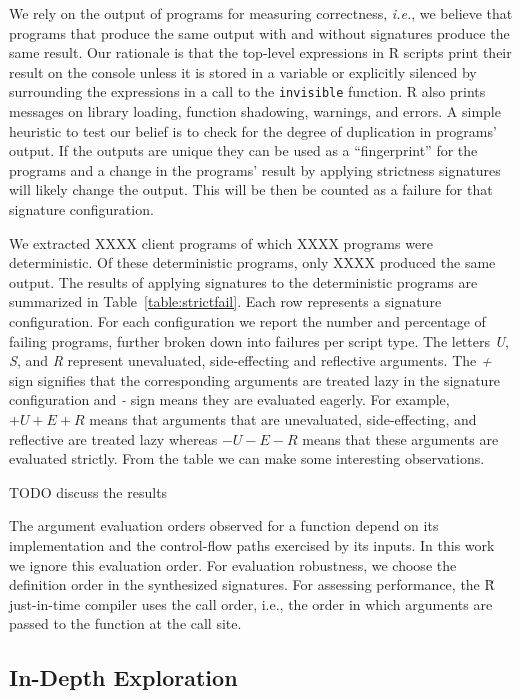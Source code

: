 \documentclass[review,nonacm,screen,acmsmall,anonymous=true]{acmart}
\newcommand{\authorcomment}[3]{}
\newcommand{\AG}[1]{\authorcomment{orange}{AG}{#1}}
\newcommand{\code}[1]{\lstinline |#1|\xspace}
\renewcommand{\Rsh}{{\sf\u R}\xspace}
\begin{document}
We rely on the output of programs for measuring correctness, \emph{i.e.}, we
believe that programs that produce the same output with and without signatures
produce the same result. Our rationale is that the top-level expressions in R
scripts print their result on the console unless it is stored in a variable or
explicitly silenced by surrounding the expressions in a call to the
\code{invisible} function. R also prints messages on library loading, function
shadowing, warnings, and errors. A simple heuristic to test our belief is to
check for the degree of duplication in programs' output. If the outputs are
unique they can be used as a ``fingerprint'' for the programs and a change in
the programs' result by applying strictness signatures will likely change the
output. This will be then be counted as a failure for that signature
configuration.

We extracted XXXX client programs of which XXXX programs were deterministic. Of
these deterministic programs, only XXXX produced the same output. The results of
applying signatures to the deterministic programs are summarized in
Table~\ref{table:strictfail}. Each row represents a signature configuration. For
each configuration we report the number and percentage of failing programs,
further broken down into failures per script type. The letters \emph{U},
\emph{S}, and \emph{R} represent unevaluated, side-effecting and reflective
arguments. The \emph{+} sign signifies that the corresponding arguments are
treated lazy in the signature configuration and \emph{-} sign means they are
evaluated eagerly. For example, $+U+E+R$ means that arguments that are
unevaluated, side-effecting, and reflective are treated lazy whereas $-U-E-R$
means that these arguments are evaluated strictly. From the table we can make
some interesting observations. 


TODO discuss the results

The argument evaluation orders observed for a function depend on its
implementation and the control-flow paths exercised by its inputs. In this work
we ignore this evaluation order. For evaluation robustness, we choose the
definition order in the synthesized signatures. For assessing performance, the
\Rsh just-in-time compiler uses the call order, i.e., the order in which
arguments are passed to the function at the call site.


\AG{Threats to validity: rlang has defiintion of SEXP.}


\subsection{In-Depth Exploration}\label{sec:lazr-discussion}
\end{document}
